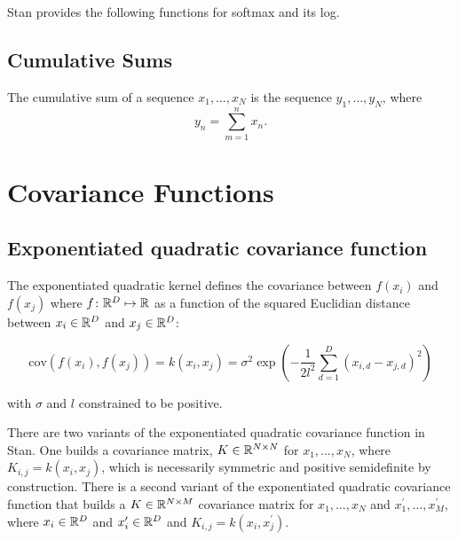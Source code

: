 Stan provides the following functions for softmax and its log.
%
\begin{description}
%
\end{description}
%

\subsection{Cumulative Sums}

The cumulative sum of a sequence $x_1,\ldots,x_N$ is the 
sequence $y_1,\ldots,y_N$, where 
%
\[
y_n = \sum_{m = 1}^{n} x_n.
\]

\begin{description}
%
%
%
%
\end{description}

\section{Covariance Functions}\label{covariance.section}

\subsection{Exponentiated quadratic covariance function}

The exponentiated quadratic kernel defines the covariance between $f(x_i)$ and
$f(x_j)$ where $f\colon \reals^D \mapsto \reals$ as a function of the squared
Euclidian distance between $x_i \in \reals^D$ and $x_j \in \reals^D$:

\[
  \text{cov}(f(x_i), f(x_j)) = k(x_i, x_j) 
= \sigma^2 
\exp \left(
	- \dfrac{1}{2l^2} \sum_{d=1}^D (x_{i,d} - x_{j,d})^2
\right)
\]

\noindent with $\sigma$ and $l$ constrained to be positive.

There are two variants of the exponentiated quadratic covariance function in
Stan. One builds a covariance matrix, $K \in \reals^{N \times N}$ for $x_1,
\dots, x_N$, where $K_{i,j} = k(x_i, x_j)$, which is necessarily symmetric and
positive semidefinite by construction. There is a second variant of the
exponentiated quadratic covariance function that builds a $K \in \reals^{N
\times M}$ covariance matrix for $x_1, \dots, x_N$ and $x^\prime_1, \dots,
x^\prime_M$, where $x_i \in \reals^D$ and $x^\prime_i \in \reals^D$ and
$K_{i,j} = k(x_i, x^\prime_j)$.


